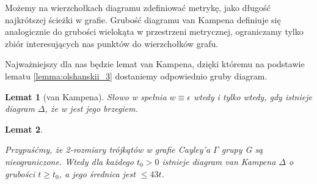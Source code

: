 \documentclass[licencjacka]{pracamgr}
\newtheorem{lemma}{Lemat}[section]
\begin{document}


Możemy na wierzchołkach diagramu zdefiniować metrykę, jako długość najkrótszej ścieżki w grafie. Grubość diagramu van Kampena definiuje się analogicznie do grubości wielokąta w przestrzeni metrycznej, ograniczamy tylko zbiór interesujących nas punktów do wierzchołków grafu.

Najważniejszy dla nas będzie lemat van Kampena, dzięki któremu na podstawie lematu \ref{lemma:olshanskii_3} dostaniemy odpowiednio gruby diagram.

\begin{lemma}[van Kampena]

Słowo w spełnia $w \equiv \epsilon$ wtedy i tylko wtedy, gdy istnieje diagram $\Delta$, że w jest jego brzegiem.

\end{lemma}

\begin{lemma}\label{lemma:olshanskii_4}

Przypuśćmy, że 2-rozmiary trójkątów w grafie Cayley'a $\Gamma$ grupy G są nieograniczone. Wtedy dla każdego $t_{0} > 0$ istnieje diagram van Kampena $\Delta$ o grubości $t \geq t_{0}$, a jego średnica jest $\leq 43t$.

\end{lemma}
\end{document}
